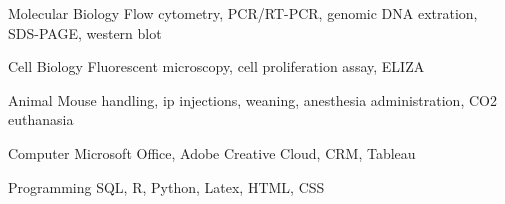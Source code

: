 

\begin{cvskills}

  \cvskill
    {Molecular Biology} %
    {Flow cytometry, PCR/RT-PCR, genomic DNA extration, SDS-PAGE, western blot} %

  \cvskill
    {Cell Biology} %
    {Fluorescent microscopy, cell proliferation assay, ELIZA} %

  \cvskill
    {Animal} %
    {Mouse handling, ip injections, weaning, anesthesia administration, CO2 euthanasia } %

  \cvskill
    {Computer} %
    {Microsoft Office, Adobe Creative Cloud, CRM, Tableau} %

  \cvskill
    {Programming} %
    {SQL, R, Python, Latex, HTML, CSS} %

\end{cvskills}
